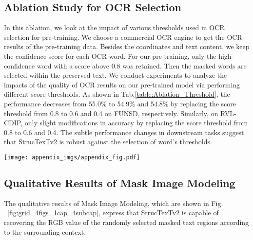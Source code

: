 \documentclass{article} %
\begin{document}
\subsection{Ablation Study for OCR Selection}
In this ablation, we look at the impact of various thresholds used in OCR selection for pre-training. We choose a commercial OCR engine to get the OCR results of the pre-training data. Besides the coordinates and text content, we keep the confidence score for each OCR word. For our pre-training, only the high-confidence word with a score above 0.8 was retained. Then the masked words are selected within the preserved text. We conduct experiments to analyze the impacts of the quality of OCR results on our pre-trained model via performing different score thresholds. As shown in Tab.\ref{table:Ablation_Threshold}, the performance decreases from 55.0\% to 54.9\% and 54.8\% by replacing the score threshold from 0.8 to 0.6 and 0.4 on FUNSD, respectively. Similarly, on RVL-CDIP, only slight modifications in accuracy by replacing the score threshold from 0.8 to 0.6 and 0.4. The subtle performance changes in downstream tasks suggest that StrucTexTv2 is robust against the selection of word's thresholds.

\begin{table}[ht]
\caption{Ablation study for the impacts of different thresholds used in OCR selection. The model is pre-trained with only MIM task.}
\label{table:Ablation_Threshold}
\vspace{-0.5em}
\begin{center}
\end{center}
\vspace{-0.5em}
\end{table}


\begin{figure*}
 \centering
 \texttt{[image: appendix\_imgs/appendix\_fig.pdf]}
 \caption{The qualitative results of Mask Image Modeling. From left to right: the masked document image, document reconstruction without content information from MLM, and document reconstruction with content information from MLM.}
\label{fig:grid_4figs_1cap_4subcap}
\end{figure*}

\subsection{Qualitative Results of Mask Image Modeling}
The qualitative results of Mask Image Modeling, which are shown in Fig. ~\ref{fig:grid_4figs_1cap_4subcap}, express that StrucTexTv2 is capable of recovering the RGB value of the randomly selected masked text regions according to the surrounding context.
\end{document}
